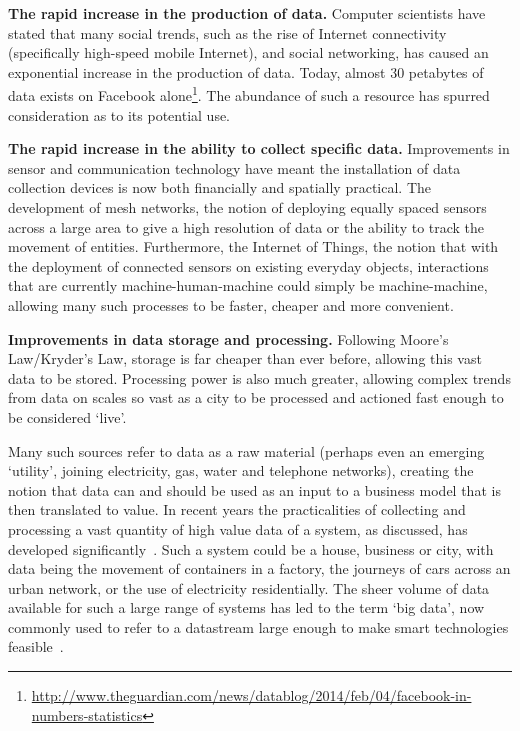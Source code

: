 \documentclass[conference]{IEEEtran}
\begin{document}
\begin{compactenum}
\item {\textbf{The rapid increase in the production of data.}}
  Computer scientists have stated that many social trends, such as the
  rise of Internet connectivity (specifically high-speed mobile
  Internet), and social networking, has caused an exponential
  increase in the production of data. Today, almost 30 petabytes of
  data exists on Facebook alone\footnote{\url{http://www.theguardian.com/news/datablog/2014/feb/04/facebook-in-numbers-statistics}}. The abundance of such a
  resource has spurred consideration as to its potential use.
\item {\textbf{The rapid increase in the ability to collect specific
      data.}} Improvements in sensor and communication technology have
  meant the installation of data collection devices is now both financially and
  spatially practical. The development of mesh networks, the notion of deploying equally
  spaced sensors across a large area to give a high resolution of data
  or the ability to track the movement of entities. Furthermore, the
  Internet of Things, the notion that with the deployment of
  connected sensors on existing everyday objects, interactions that
  are currently machine-human-machine could simply be machine-machine,
  allowing many such processes to be faster, cheaper and  more
  convenient. 
\item {\textbf{Improvements in data storage and processing.}} Following
  Moore’s Law/Kryder's Law, storage is far cheaper than ever before, allowing
  this vast data to be stored. Processing power is also much greater,
  allowing complex trends from data on scales so vast as a city to be
  processed and actioned fast enough to be considered `live'.
\end{compactenum}

Many such sources refer to data as a raw material (perhaps even an
emerging `utility', joining electricity, gas, water and telephone
networks), creating the notion that data can and should be used as an
input to a business model that is then translated to value. In recent
years the practicalities of collecting and processing a vast quantity
of high value data of a system, as discussed, has developed
significantly~\cite{arup-et-al:2011}. Such a system could be a house,
business or city, with data being the movement of containers in a
factory, the journeys of cars across an urban network, or the use of
electricity residentially. The sheer volume of data available for such
a large range of systems has led to the term `big data’, now commonly
used to refer to a datastream large enough to make smart technologies
feasible~\cite{hollands:2008,ibmsmartcities:2009,ciscoconcities:2010}.
\end{document}
